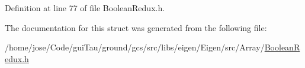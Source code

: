 Definition at line 77 of file Boolean\-Redux.\-h.



The documentation for this struct was generated from the following file\-:\begin{DoxyCompactItemize}
\item 
/home/jose/\-Code/gui\-Tau/ground/gcs/src/libs/eigen/\-Eigen/src/\-Array/\hyperlink{_boolean_redux_8h}{Boolean\-Redux.\-h}\end{DoxyCompactItemize}
